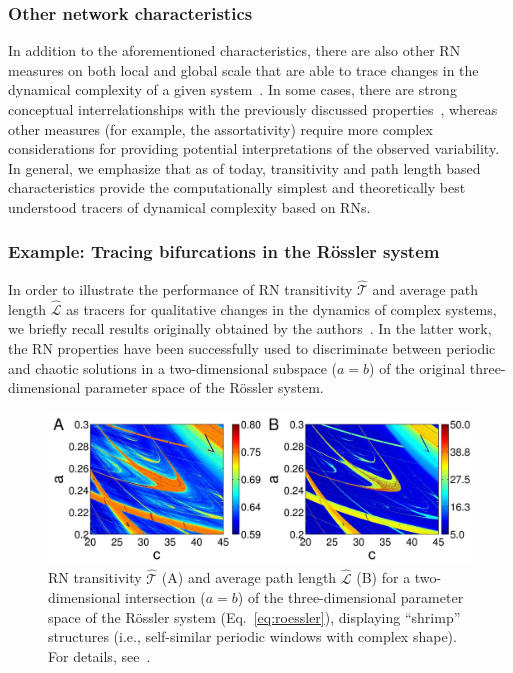 \documentclass[graybox]{svmult}
\begin{document}
\subsubsection{Other network characteristics}

In addition to the aforementioned characteristics, there are also other RN measures on both local and global scale that are able to trace changes in the dynamical complexity of a given system~\cite{Donges2011NPG,Zou2012aChaos,Zou2012bChaos}. In some cases, there are strong conceptual interrelationships with the previously discussed properties~\cite{Donges2011NPG}, whereas other measures (for example, the assortativity) require more complex considerations for providing potential interpretations of the observed variability. In general, we emphasize that as of today, transitivity and path length based characteristics provide the computationally simplest and theoretically best understood tracers of dynamical complexity based on RNs.


\subsubsection{Example: Tracing bifurcations in the R\"ossler system}

In order to illustrate the performance of RN transitivity $\hat{\mathcal{T}}$ and average path length $\hat{\mathcal{L}}$ as tracers for qualitative changes in the dynamics of complex systems, we briefly recall results originally obtained by the authors~\cite{Zou2010}. In the latter work, the RN properties have been successfully used to discriminate between periodic and chaotic solutions in a two-dimensional subspace ($a=b$) of the original three-dimensional parameter space of the R\"ossler system.

\begin{figure}
\centering
\includegraphics[width=\columnwidth]{ros_shrimp_eBook.pdf} 
\caption{RN transitivity $\hat{\mathcal{T}}$ (A) and average path length $\hat{\mathcal{L}}$ (B) for a two-dimensional intersection ($a=b$) of the three-dimensional parameter space of the R\"ossler system (Eq.~\ref{eq:roessler}), displaying ``shrimp'' structures (i.e., self-similar periodic windows with complex shape). For details, see~\cite{Zou2010}.}
\label{fig:roessler_shrimp}
\end{figure}
\end{document}
